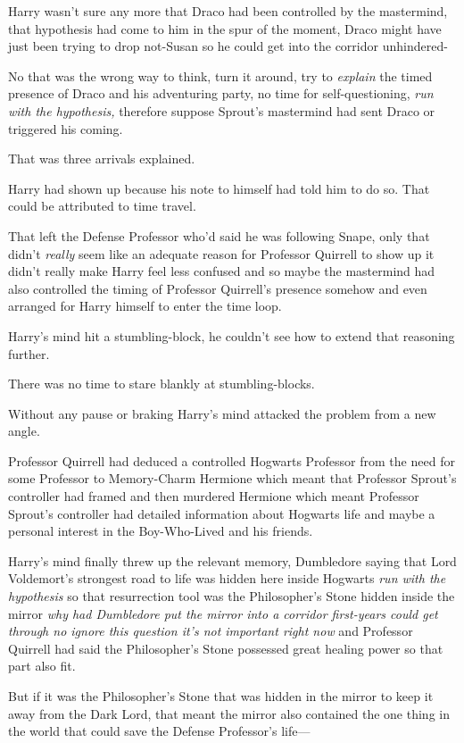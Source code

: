 Harry wasn't sure any more that Draco had been controlled by the mastermind, 
that hypothesis had come to him in the spur of the moment, Draco might have 
just been trying to drop not-Susan so he could get into the corridor unhindered-

No that was the wrong way to think, turn it around, try to \emph{explain} the 
timed presence of Draco and his adventuring party, no time for 
self-questioning, \emph{run with the hypothesis,} therefore suppose Sprout's 
mastermind had sent Draco or triggered his coming.

That was three arrivals explained.

Harry had shown up because his note to himself had told him to do so. That 
could be attributed to time travel.

That left the Defense Professor who'd said he was following Snape, only that 
didn't \emph{really} seem like an adequate reason for Professor Quirrell to 
show up it didn't really make Harry feel less confused and so maybe the 
mastermind had also controlled the timing of Professor Quirrell's presence 
somehow and even arranged for Harry himself to enter the time loop.

Harry's mind hit a stumbling-block, he couldn't see how to extend that 
reasoning further.

There was no time to stare blankly at stumbling-blocks.

Without any pause or braking Harry's mind attacked the problem from a new angle.

Professor Quirrell had deduced a controlled Hogwarts Professor from the need 
for some Professor to Memory-Charm Hermione which meant that Professor Sprout's 
controller had framed and then murdered Hermione which meant Professor Sprout's 
controller had detailed information about Hogwarts life and maybe a personal 
interest in the Boy-Who-Lived and his friends.

Harry's mind finally threw up the relevant memory, Dumbledore saying that Lord 
Voldemort's strongest road to life was hidden here inside Hogwarts \emph{run 
with the hypothesis} so that resurrection tool was the Philosopher's Stone 
hidden inside the mirror \emph{why had Dumbledore put the mirror into a 
corridor first-years could get through no ignore this question it's not 
important right now} and Professor Quirrell had said the Philosopher's Stone 
possessed great healing power so that part also fit.

But if it was the Philosopher's Stone that was hidden in the mirror to keep it 
away from the Dark Lord, that meant the mirror also contained the one thing in 
the world that could save the Defense Professor's life---

